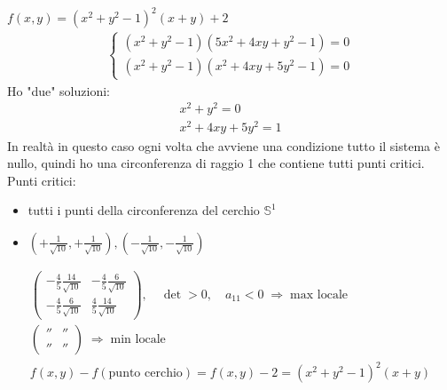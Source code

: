 \documentclass[a4paper, oneside]{article}
\begin{document}
    \begin{example}
            \hfil\\
    \begin{center}
    \end{center}
            $f(x,y) = (x^2+y^2-1)^2(x+y)+2$
            \begin{gather*}
                \begin{cases}
                    (x^2+y^2-1)(5x^2+4xy+y^2-1) = 0\\
                    (x^2+y^2-1)(x^2+4xy+5y^2-1) = 0
                \end{cases}
            \end{gather*}
            Ho "due" soluzioni:
            \begin{gather*}
                x^2 + y^2 = 0\\
                x^2+4xy+5y^2 = 1
            \end{gather*}
            In realtà in questo caso ogni volta che avviene una condizione tutto il sistema è nullo, quindi ho una circonferenza di raggio 1 che contiene tutti punti critici.\\
            Punti critici:
            \begin{itemize}
                \item tutti i punti della circonferenza del cerchio $\mathbb{S}^1$
                \item $(+\frac{1}{\sqrt{10}}, +\frac{1}{\sqrt{10}}), (-\frac{1}{\sqrt{10}},-\frac{1}{\sqrt{10}})$
            \end{itemize}
            \begin{gather*}
            \begin{pmatrix}
            -\frac{4}{5}\frac{14}{\sqrt{10}} & -\frac{4}{5}\frac{6}{\sqrt{10}}\\
            -\frac{4}{5}\frac{6}{\sqrt{10}} & \frac{4}{5}\frac{14}{\sqrt{10}}
            \end{pmatrix}, \quad \det > 0, \quad a_{11} < 0 \;\Rightarrow\; \text{max locale}
            \\[1em]
            \begin{pmatrix}
            '' & ''\\
            '' & ''
            \end{pmatrix} \;\Rightarrow\; \text{min locale}
            \\[1em]
            f(x,y) - f(\text{punto cerchio}) = f(x,y) - 2 = (x^2 + y^2 - 1)^2 (x + y)
            \end{gather*}

        \end{example}
\end{document}
